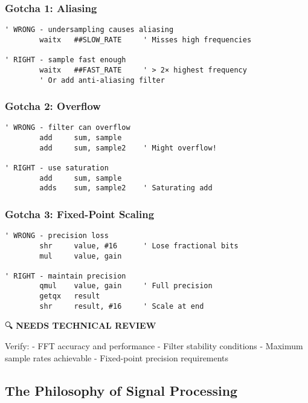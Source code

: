\documentclass[11pt]{book}
\begin{document}
\hypertarget{gotcha-1-aliasing}{%
\subsubsection{Gotcha 1: Aliasing}\label{gotcha-1-aliasing}}

\begin{lstlisting}
' WRONG - undersampling causes aliasing
        waitx   ##SLOW_RATE     ' Misses high frequencies
        
' RIGHT - sample fast enough
        waitx   ##FAST_RATE     ' > 2× highest frequency
        ' Or add anti-aliasing filter
\end{lstlisting}

\hypertarget{gotcha-2-overflow}{%
\subsubsection{Gotcha 2: Overflow}\label{gotcha-2-overflow}}

\begin{lstlisting}
' WRONG - filter can overflow
        add     sum, sample
        add     sum, sample2    ' Might overflow!
        
' RIGHT - use saturation
        add     sum, sample
        adds    sum, sample2    ' Saturating add
\end{lstlisting}

\hypertarget{gotcha-3-fixed-point-scaling}{%
\subsubsection{Gotcha 3: Fixed-Point
Scaling}\label{gotcha-3-fixed-point-scaling}}

\begin{lstlisting}
' WRONG - precision loss
        shr     value, #16      ' Lose fractional bits
        mul     value, gain
        
' RIGHT - maintain precision
        qmul    value, gain     ' Full precision
        getqx   result
        shr     result, #16     ' Scale at end
\end{lstlisting}

\begin{review}
🔍 \textbf{NEEDS TECHNICAL REVIEW}

Verify:
- FFT accuracy and performance
- Filter stability conditions
- Maximum sample rates achievable
- Fixed-point precision requirements
\end{review}

\hypertarget{the-philosophy-of-signal-processing}{%
\subsection{The Philosophy of Signal
Processing}\label{the-philosophy-of-signal-processing}}
\end{document}

